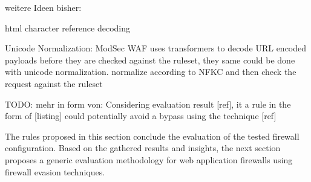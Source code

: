 {\color{red}weitere Ideen bisher:}

html character reference decoding


Unicode Normalization: ModSec WAF uses transformers to decode URL encoded payloads before they are checked against the ruleset, they same could be done with unicode normalization. normalize according to NFKC and then check the request against the ruleset



{\color{red} TODO: mehr in form von: Considering evaluation result [ref], it a rule in the form of [listing] could potentially avoid a bypass using the technique [ref]}

The rules proposed in this section conclude the evaluation of the tested firewall configuration. Based on the gathered results and insights, the next section proposes a generic evaluation methodology for web application firewalls using firewall evasion techniques.
